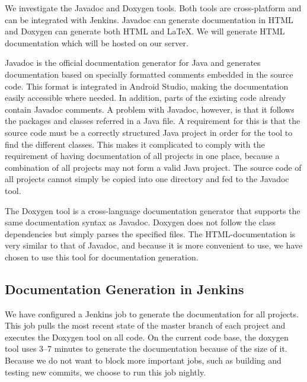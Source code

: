 We investigate the Javadoc \parencite{javadoc} and Doxygen \parencite{doxygen} tools. Both tools are cross-platform and can be integrated with Jenkins. Javadoc can generate documentation in HTML and Doxygen can generate both HTML and \LaTeX. We will generate HTML documentation which will be hosted on our server.

Javadoc is the official documentation generator for Java and generates documentation based on specially formatted comments embedded in the source code. This format is integrated in Android Studio, making the documentation easily accessible where needed. In addition, parts of the existing code already contain Javadoc comments. A problem with Javadoc, however, is that it follows the packages and classes referred in a Java file. A requirement for this is that the source code must be a correctly structured Java project in order for the tool to find the different classes. This makes it complicated to comply with the requirement of having documentation of all projects in one place, because a combination of all projects may not form a valid Java project. The source code of all projects cannot simply be copied into one directory and fed to the Javadoc tool.

The Doxygen tool is a cross-language documentation generator that supports the same documentation syntax as Javadoc. Doxygen does not follow the class dependencies but simply parses the specified files. The HTML-documentation is very similar to that of Javadoc, and because it is more convenient to use, we have chosen to use this tool for documentation generation.

\subsection{Documentation Generation in Jenkins}
We have configured a Jenkins job to generate the documentation for all projects. This job pulls the most recent state of the master branch of each project and executes the Doxygen tool on all code. On the current code base, the doxygen tool uses 3--7 minutes to generate the documentation because of the size of it. Because we do not want to block more important jobs, such as building and testing new commits, we choose to run this job nightly.